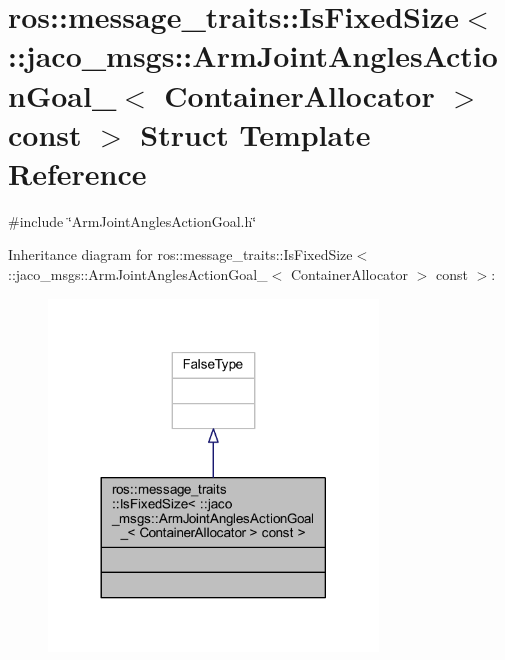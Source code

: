 \hypertarget{structros_1_1message__traits_1_1IsFixedSize_3_01_1_1jaco__msgs_1_1ArmJointAnglesActionGoal___3_03024d5d77fc2a9a922e7889fbee57813}{}\section{ros\+:\+:message\+\_\+traits\+:\+:Is\+Fixed\+Size$<$ \+:\+:jaco\+\_\+msgs\+:\+:Arm\+Joint\+Angles\+Action\+Goal\+\_\+$<$ Container\+Allocator $>$ const $>$ Struct Template Reference}
\label{structros_1_1message__traits_1_1IsFixedSize_3_01_1_1jaco__msgs_1_1ArmJointAnglesActionGoal___3_03024d5d77fc2a9a922e7889fbee57813}


{\ttfamily \#include \char`\"{}Arm\+Joint\+Angles\+Action\+Goal.\+h\char`\"{}}



Inheritance diagram for ros\+:\+:message\+\_\+traits\+:\+:Is\+Fixed\+Size$<$ \+:\+:jaco\+\_\+msgs\+:\+:Arm\+Joint\+Angles\+Action\+Goal\+\_\+$<$ Container\+Allocator $>$ const $>$\+:
\nopagebreak
\begin{figure}[H]
\begin{center}
\leavevmode
\includegraphics[width=248pt]{df/d4a/structros_1_1message__traits_1_1IsFixedSize_3_01_1_1jaco__msgs_1_1ArmJointAnglesActionGoal___3_07f8263655d405d879d37d1e87eb3a5d3}
\end{center}
\end{figure}


